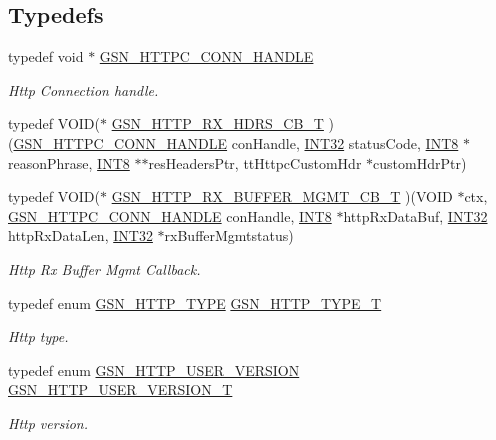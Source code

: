 \subsection*{Typedefs}
\begin{DoxyCompactItemize}
\item 
typedef void $\ast$ \hyperlink{a00665_ga873d4cd3603c5dd91494d571445cc7f7}{GSN\_\-HTTPC\_\-CONN\_\-HANDLE}
\begin{DoxyCompactList}\small\item\em Http Connection handle. \end{DoxyCompactList}\item 
typedef VOID($\ast$ \hyperlink{a00507_ac8f1951ac3188114d05c988f1c689b0f}{GSN\_\-HTTP\_\-RX\_\-HDRS\_\-CB\_\-T} )(\hyperlink{a00665_ga873d4cd3603c5dd91494d571445cc7f7}{GSN\_\-HTTPC\_\-CONN\_\-HANDLE} conHandle, \hyperlink{a00660_ga63021d67d54286c2163bcdb43a6f2569}{INT32} statusCode, \hyperlink{a00660_ga307b8734c020247f6bac4fcde0dcfbb9}{INT8} $\ast$reasonPhrase, \hyperlink{a00660_ga307b8734c020247f6bac4fcde0dcfbb9}{INT8} $\ast$$\ast$resHeadersPtr, ttHttpcCustomHdr $\ast$customHdrPtr)
\item 
typedef VOID($\ast$ \hyperlink{a00665_ga4f384de3cef47243fc55fee382201152}{GSN\_\-HTTP\_\-RX\_\-BUFFER\_\-MGMT\_\-CB\_\-T} )(VOID $\ast$ctx, \hyperlink{a00665_ga873d4cd3603c5dd91494d571445cc7f7}{GSN\_\-HTTPC\_\-CONN\_\-HANDLE} conHandle, \hyperlink{a00660_ga307b8734c020247f6bac4fcde0dcfbb9}{INT8} $\ast$httpRxDataBuf, \hyperlink{a00660_ga63021d67d54286c2163bcdb43a6f2569}{INT32} httpRxDataLen, \hyperlink{a00660_ga63021d67d54286c2163bcdb43a6f2569}{INT32} $\ast$rxBufferMgmtstatus)
\begin{DoxyCompactList}\small\item\em Http Rx Buffer Mgmt Callback. \end{DoxyCompactList}\item 
typedef enum \hyperlink{a00665_ga918ab72c19100d330e6d4854b0ac0612}{GSN\_\-HTTP\_\-TYPE} \hyperlink{a00665_ga72317a89375e9f3d889df0439bff53ba}{GSN\_\-HTTP\_\-TYPE\_\-T}
\begin{DoxyCompactList}\small\item\em Http type. \end{DoxyCompactList}\item 
typedef enum \hyperlink{a00665_ga91d9306148208fe7d577c525bc69fb3b}{GSN\_\-HTTP\_\-USER\_\-VERSION} \hyperlink{a00665_ga8a5357a42219f22430d5bf97d136092d}{GSN\_\-HTTP\_\-USER\_\-VERSION\_\-T}
\begin{DoxyCompactList}\small\item\em Http version. \end{DoxyCompactList}\item 
$$
\end{DoxyCompactItemize}
